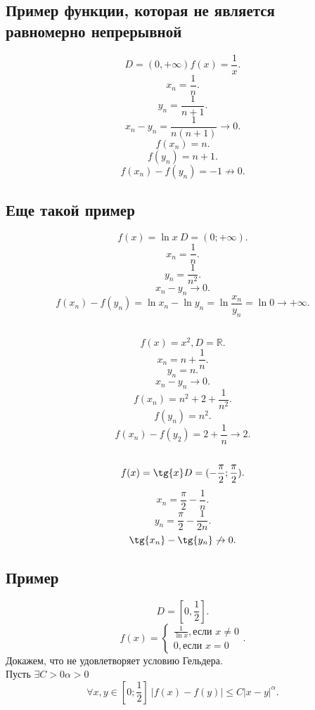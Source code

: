 \documentclass{scrartcl}
\begin{document}
     \subsection{Пример функции, которая не является равномерно непрерывной}
     \[
     D = (0,+\infty) f(x) = \frac{1}{x}
     .\] 
     \[
     x_{n} = \frac{1}{n}
     .\] 
     \[
     y_{n} = \frac{1}{n + 1}
     .\] 
     \[
     x_{n} - y_{n}= \frac{1}{n(n + 1)} \to 0
     .\] 
     \[
     f(x_{n}) = n
     .\] 
     \[
     f(y_{n}) = n + 1
     .\] 
     \[
     f(x_{n}) - f(y_{n}) = -1 \not \to 0
     .\] 
\subsection{Еще такой пример}
\[
    f(x) = \ln{x} ~ D = (0;+\infty)
.\] 
\[
x_{n} = \frac{1}{n}
.\] 
\[
y_{n} = \frac{1}{n^2}
.\] 
\[
x_{n} - y_{n} \to 0
.\] 
\[
    f(x_{n}) - f(y_{n}) = \ln{x_{n}} - \ln{y_{n}} = \ln{\frac{x_{n}}{y_{n}}} = \ln{0} \to +\infty
.\] 
\subsection{}
\[
f(x) = x^2, D =\mathbb{R}
.\] 
\[
x_{n} =  n + \frac{1}{n}
.\] 
\[
y_{n} = n
.\] 
\[
x_{n} - y_{n} \to 0
.\] 
\[
f(x_{n}) = n^2 + 2 + \frac{1}{n^2}
.\] 
\[
f(y_{n}) =n ^2
.\] 
\[
f(x_{n}) - f(y_{2}) = 2 + \frac{1}{n} \to 2
.\] 
\subsection{}
\[
    f(x) = \tg{x} D = (-\frac{\pi}{2};\frac{\pi}{2})
.\] 
\[
x_{n} = \frac{\pi}{2} - \frac{1}{n}
.\] 
\[
y_{n} = \frac{\pi}{2} - \frac{1}{2n}
.\] 
\[
    \tg{x_{n}} - \tg{y_{n}} \not \to 0
.\] 
\subsection{Пример}
\[
    D = [0,\frac{1}{2}]
.\] 
\[
f(x) = 
\begin{cases}
    \frac{1}{\ln{x}}, \text{если } x \neq 0\\
    0, \text{если } x = 0
\end{cases}
.\] 
Докажем, что не удовлетворяет условию Гельдера.\\
Пусть $\exists  C >0 \alpha >0 $
\[
    \forall  x, y \in [0; \frac{1}{2}] ~ |f(x) - f(y)| \le  C |x - y|^{\alpha}
.\] 
\end{document}
